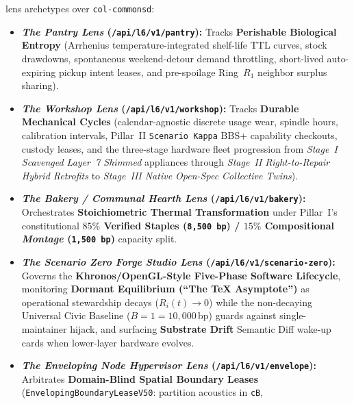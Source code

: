 \begin{enumerate}
          lens archetypes over \texttt{col-commonsd}:
          \begin{itemize}
              \item \textbf{\textit{The Pantry Lens} (\texttt{/api/l6/v1/pantry}):} Tracks
                    \textbf{Perishable Biological Entropy} (Arrhenius temperature-integrated
                    shelf-life TTL curves, stock drawdowns, spontaneous weekend-detour demand
                    throttling, short-lived auto-expiring pickup intent leases, and pre-spoilage
                    Ring~$R_1$ neighbor surplus sharing).
              \item \textbf{\textit{The Workshop Lens} (\texttt{/api/l6/v1/workshop}):} Tracks
                    \textbf{Durable Mechanical Cycles} (calendar-agnostic discrete usage wear,
                    spindle hours, calibration intervals, Pillar~II \texttt{Scenario Kappa} BBS+
                    capability checkouts, custody leases, and the three-stage hardware fleet
                    progression from \textit{Stage~I Scavenged Layer~7 Shimmed} appliances through
                    \textit{Stage~II Right-to-Repair Hybrid Retrofits} to \textit{Stage~III Native
                    Open-Spec Collective Twins}).
              \item \textbf{\textit{The Bakery / Communal Hearth Lens} (\texttt{/api/l6/v1/bakery}):}
                    Orchestrates \textbf{Stoichiometric Thermal Transformation} under Pillar~I's
                    constitutional \textbf{$85\%$ Verified Staples (\texttt{8,500 bp}) / $15\%$
                    Compositional \textit{Montage} (\texttt{1,500 bp})} capacity split.
              \item \textbf{\textit{The Scenario Zero Forge Studio Lens} (\texttt{/api/l6/v1/scenario-zero}):}
                    Governs the \textbf{Khronos/OpenGL-Style Five-Phase Software Lifecycle},
                    monitoring \textbf{Dormant Equilibrium (``The \TeX{} Asymptote'')} as
                    operational stewardship decays ($R_i(t) \to 0$) while the non-decaying Universal
                    Civic Baseline ($B = 1 = 10{,}000\,\mathrm{bp}$) guards against
                    single-maintainer hijack, and surfacing \textbf{Substrate Drift} Semantic Diff
                    wake-up cards when lower-layer hardware evolves.
              \item \textbf{\textit{The Enveloping Node Hypervisor Lens} (\texttt{/api/l6/v1/envelope}):}
                    Arbitrates \textbf{Domain-Blind Spatial Boundary Leases}
                    (\texttt{EnvelopingBoundaryLeaseV50}: partition acoustics in \texttt{cB},

\end{itemize}
\end{enumerate}
